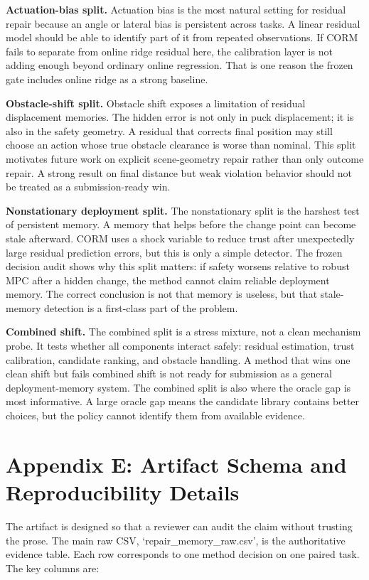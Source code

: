 \documentclass{article}
\begin{document}
\textbf{Actuation-bias split.} Actuation bias is the most natural setting for residual repair because an angle or lateral bias is persistent across tasks. A linear residual model should be able to identify part of it from repeated observations. If CORM fails to separate from online ridge residual here, the calibration layer is not adding enough beyond ordinary online regression. That is one reason the frozen gate includes online ridge as a strong baseline.

\textbf{Obstacle-shift split.} Obstacle shift exposes a limitation of residual displacement memories. The hidden error is not only in puck displacement; it is also in the safety geometry. A residual that corrects final position may still choose an action whose true obstacle clearance is worse than nominal. This split motivates future work on explicit scene-geometry repair rather than only outcome repair. A strong result on final distance but weak violation behavior should not be treated as a submission-ready win.

\textbf{Nonstationary deployment split.} The nonstationary split is the harshest test of persistent memory. A memory that helps before the change point can become stale afterward. CORM uses a shock variable to reduce trust after unexpectedly large residual prediction errors, but this is only a simple detector. The frozen decision audit shows why this split matters: if safety worsens relative to robust MPC after a hidden change, the method cannot claim reliable deployment memory. The correct conclusion is not that memory is useless, but that stale-memory detection is a first-class part of the problem.

\textbf{Combined shift.} The combined split is a stress mixture, not a clean mechanism probe. It tests whether all components interact safely: residual estimation, trust calibration, candidate ranking, and obstacle handling. A method that wins one clean shift but fails combined shift is not ready for submission as a general deployment-memory system. The combined split is also where the oracle gap is most informative. A large oracle gap means the candidate library contains better choices, but the policy cannot identify them from available evidence.

\section*{Appendix E: Artifact Schema and Reproducibility Details}

The artifact is designed so that a reviewer can audit the claim without trusting the prose. The main raw CSV, `repair\_memory\_raw.csv', is the authoritative evidence table. Each row corresponds to one method decision on one paired task. The key columns are:
\end{document}

